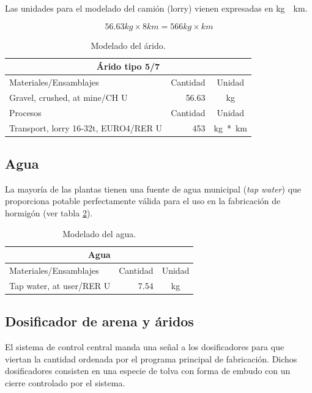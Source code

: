 Las unidades para el modelado del camión (lorry) vienen expresadas en \si{kg\times km}.

\begin{equation}
56.63 kg \times 8 km = 566 kg\times km
\end{equation}

\begin{table}[!htb]
\centering
\begin{tabular}{p{8cm}rc}
\toprule
\multicolumn{3}{c}{Árido tipo 5/7}\\
\midrule
Materiales/Ensamblajes & Cantidad & Unidad\\
\midrule
Gravel, crushed, at mine/CH U & 56.63 & \si{kg}\\
\midrule
Procesos & Cantidad & Unidad\\
\midrule
Transport, lorry 16-32t, EURO4/RER U & 453 & \si{kg*km}\\
\bottomrule
\end{tabular}
\caption{Modelado del árido.}
\label{modeladodearido}
\end{table}


\subsection{Agua}
La mayoría de las plantas tienen una fuente de agua municipal (\textit{tap water}) que proporciona potable perfectamente válida para el uso en la fabricación de hormigón (ver tabla \ref{modeladodelagua}).

\begin{table}[!htb]
\centering
\begin{tabular}{p{8cm}rc}
\toprule
\multicolumn{3}{c}{Agua}\\
\midrule
Materiales/Ensamblajes & Cantidad & Unidad\\
\midrule
Tap water, at user/RER U & 7.54 & \si{kg}\\
\bottomrule
\end{tabular}
\caption{Modelado del agua.}
\label{modeladodelagua}
\end{table}

\subsection{Dosificador de arena y áridos}

El sistema de control central manda una señal a los dosificadores para que viertan la cantidad ordenada por el programa principal de fabricación. Dichos dosificadores consisten en una especie de tolva con forma de embudo con un cierre controlado por el sistema.

